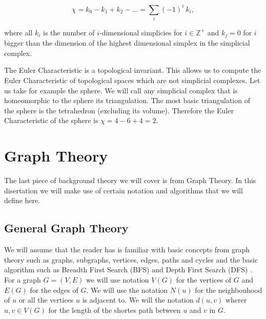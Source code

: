 %
%
%

%
%

$$ \chi = k_0 - k_1 + k_2 - ... = \sum_{i}{(-1)^i~k_i}, $$

where all $k_i$ is the number of $i$-dimensional simplicies for $i \in \mathbb{Z}^+$ and $k_j = 0$ for $i$ bigger than the dimension of the highest dimensional simplex in the simplicial complex.

The Euler Characteristic is a topological invariant. This allows us to compute the Euler Characteristic of topological spaces which are not simplicial complexes. Let us take for example the sphere. We will call any simplicial complex that is homeomorphic to the sphere its triangulation. The most basic triangulation of the sphere is the tetrahedron (excluding its volume). Therefore the Euler Characteristic of the sphere is $\chi = 4 - 6 + 4 = 2$.

\section{Graph Theory}

The last piece of background theory we will cover is from Graph Theory. In this disertation we will make use of certain notation and algorithms that we will define here.

\subsection{General Graph Theory}

We will assume that the reader has is familiar with basic concepts from graph theory such as graphs, subgraphs, vertices, edges, paths and cycles and the basic algorithm such as Breadth First Search (BFS) and Depth First Search (DFS) \cite{intro-to-algo}. For a graph $G = (V, E)$ we will use notation $V(G)$ for the vertices of $G$ and $E(G)$ for the edges of $G$. We will use the notation $N(u)$ for the neighbouhood of $u$ or all the vertices $u$ is adjacent to. We will the notation $d(u, v)$ wherer $u, v \in V(G)$ for the length of the shortes path between $u$ and $v$ in $G$.

